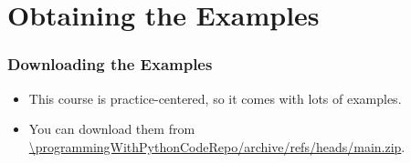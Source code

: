 \documentclass[aspectratio=169,mathserif,notheorems]{beamer}%
\begin{document}
\section{Obtaining the Examples}%
%
\begin{frame}[t]%
\frametitle{Downloading the Examples}%
\begin{itemize}%
\item This course is practice-centered, so it comes with lots of examples.
\item<2-> You can download them from \expandafter\url{\programmingWithPythonCodeRepo/archive/refs/heads/main.zip}.%
\end{itemize}%
%
%
\end{frame}%
%
\end{document}
